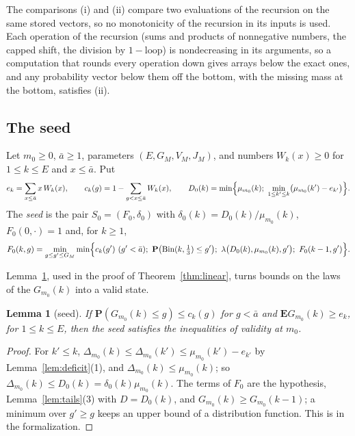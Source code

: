 \documentclass[11pt]{amsart}
\newtheorem{lemma}[theorem]{Lemma}
\theoremstyle{definition}
\numberwithin{equation}{section}
\newcommand{\lean}[1]{\ignorespaces}
\newcommand{\E}{\mathbf{E}}
\renewcommand{\P}{\mathbf{P}}
\newcommand{\Bin}{\operatorname{Bin}}
\begin{document}
The comparisons (i) and (ii) compare two evaluations of the recursion on the same stored vectors, so no monotonicity of the recursion in its inputs is used. Each operation of the recursion (sums and products of nonnegative numbers, the capped shift, the division by $1-\mathrm{loop}$) is nondecreasing in its arguments, so a computation that rounds every operation down gives arrays below the exact ones, and any probability vector below them off the bottom, with the missing mass at the bottom, satisfies (ii).

\subsection*{The seed}
Let $m_0\ge0$, $\bar a\ge1$, parameters $(E,G_M,V_M,J_M)$, and numbers $W_k(x)\ge0$ for $1\le k\le E$ and $x\le \bar a$. Put
\[
e_k=\sum_{x\le \bar a}x\,W_k(x),\qquad c_k(g)=1-\sum_{g<x\le \bar a}W_k(x),\qquad D_0(k)=\min\Bigl\{\mu_{m_0}(k);\ \min_{1\le k'\le k}\bigl(\mu_{m_0}(k')-e_{k'}\bigr)\Bigr\}. %
\]
The \emph{seed} is the pair $S_0=(F_0,\delta_0)$ with $\delta_0(k)=D_0(k)/\mu_{m_0}(k)$, $F_0(0,\cdot)=1$ and, for $k\ge1$,
\[
F_0(k,g)=\min_{g\le g'\le G_M}\min\Bigl\{c_k(g')\ (g'<\bar a);\ \P\bigl(\Bin(k,\tfrac13)\le g'\bigr);\ \lambda\bigl(D_0(k),\mu_{m_0}(k),g'\bigr);\ F_0(k-1,g')\Bigr\}. %
\]

Lemma~\ref{lem:seed}, used in the proof of Theorem~\ref{thm:linear}, turns bounds on the laws of the $G_{m_0}(k)$ into a valid state.

\begin{lemma}[seed]\label{lem:seed}\lean{FrogModel.D3.Assembly.seed_valid_proof, FrogModel.D3.Iface.seed_valid, FrogModel.D3.Iface.seedState, FrogModel.D3.Iface.F0, FrogModel.D3.Iface.D0}
If $\P(G_{m_0}(k)\le g)\le c_k(g)$ for $g<\bar a$ and $\E G_{m_0}(k)\ge e_k$, for $1\le k\le E$, then the seed satisfies the inequalities of validity at $m_0$.
\end{lemma}

\begin{proof}
For $k'\le k$, $\Delta_{m_0}(k)\le\Delta_{m_0}(k')\le\mu_{m_0}(k')-e_{k'}$ by Lemma~\ref{lem:deficit}(1), and $\Delta_{m_0}(k)\le\mu_{m_0}(k)$; so $\Delta_{m_0}(k)\le D_0(k)=\delta_0(k)\mu_{m_0}(k)$. The terms of $F_0$ are the hypothesis, Lemma~\ref{lem:tails}(3) with $D=D_0(k)$, and $G_{m_0}(k)\ge G_{m_0}(k-1)$; a minimum over $g'\ge g$ keeps an upper bound of a distribution function. This is  in the formalization.
\end{proof}
\end{document}
